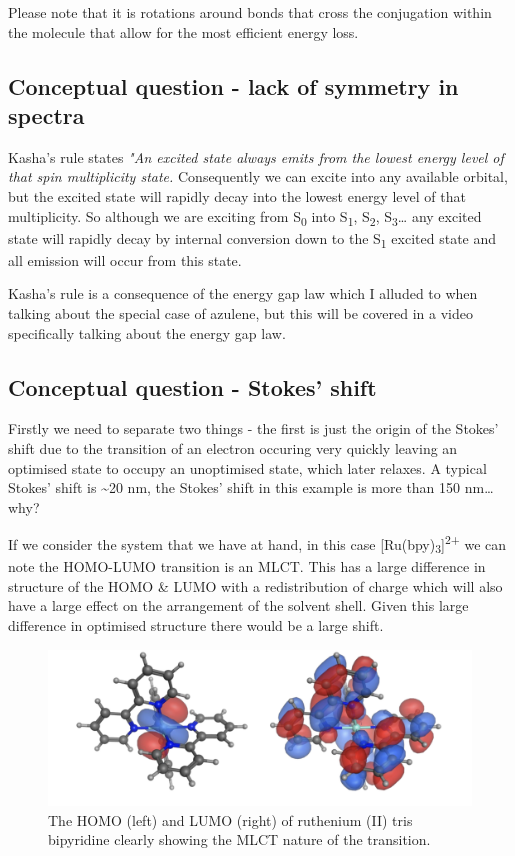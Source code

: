\documentclass[
]{book}
\begin{document}
Please note that it is rotations around bonds that cross the conjugation within the molecule that allow for the most efficient energy loss.

\hypertarget{sec:symmetryspecans}{%
\subsection{Conceptual question - lack of symmetry in spectra}\label{sec:symmetryspecans}}

Kasha's rule states \emph{"An excited state always emits from the lowest energy level of that spin multiplicity state.} Consequently we can excite into any available orbital, but the excited state will rapidly decay into the lowest energy level of that multiplicity. So although we are exciting from S\textsubscript{0} into S\textsubscript{1}, S\textsubscript{2}, S\textsubscript{3}\ldots{} any excited state will rapidly decay by internal conversion down to the S\textsubscript{1} excited state and all emission will occur from this state.

Kasha's rule is a consequence of the energy gap law which I alluded to when talking about the special case of azulene, but this will be covered in a video specifically talking about the energy gap law.

\hypertarget{sec:stokesans}{%
\subsection{Conceptual question - Stokes' shift}\label{sec:stokesans}}

Firstly we need to separate two things - the first is just the origin of the Stokes' shift due to the transition of an electron occuring very quickly leaving an optimised state to occupy an unoptimised state, which later relaxes. A typical Stokes' shift is \textasciitilde20 nm, the Stokes' shift in this example is more than 150 nm\ldots{} why?

If we consider the system that we have at hand, in this case {[}Ru(bpy)\textsubscript{3}{]}\textsuperscript{2+} we can note the HOMO-LUMO transition is an MLCT. This has a large difference in structure of the HOMO \& LUMO with a redistribution of charge which will also have a large effect on the arrangement of the solvent shell. Given this large difference in optimised structure there would be a large shift.

\begin{figure}

{\centering \includegraphics[width=0.7\linewidth]{images/RubpyMLCT} 

}

\caption{The HOMO (left) and LUMO (right) of ruthenium (II) tris bipyridine clearly showing the MLCT nature of the transition.}\label{fig:RubpyMLCT}
\end{figure}
\end{document}

